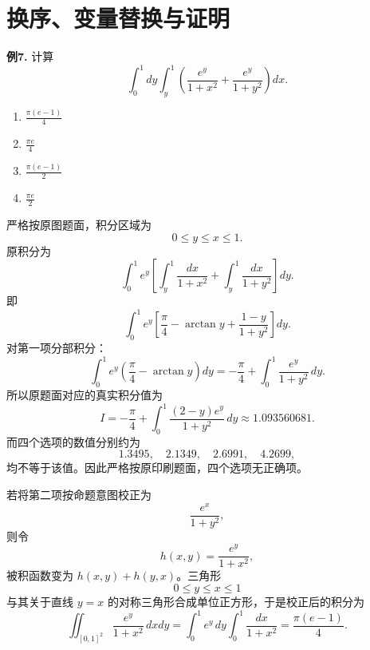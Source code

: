 \section{换序、变量替换与证明}

\begin{problemblock}
\textbf{例7.} 计算
\[
\int_0^1dy\int_y^1
\left(\frac{e^y}{1+x^2}+\frac{e^y}{1+y^2}\right)dx.
\]
\begin{enumerate}[label=\Alph*., leftmargin=2.2em]
\item \(\displaystyle \frac{\pi(e-1)}4\)
\item \(\displaystyle \frac{\pi e}{4}\)
\item \(\displaystyle \frac{\pi(e-1)}2\)
\item \(\displaystyle \frac{\pi e}{2}\)
\end{enumerate}
\end{problemblock}
\begin{solutionblock}
严格按原图题面，积分区域为
\[
0\le y\le x\le1.
\]
原积分为
\[
\int_0^1e^y\left[
\int_y^1\frac{dx}{1+x^2}
+\int_y^1\frac{dx}{1+y^2}
\right]dy.
\]
即
\[
\int_0^1e^y\left[
\frac\pi4-\arctan y+\frac{1-y}{1+y^2}
\right]dy.
\]
对第一项分部积分：
\[
\int_0^1e^y\left(\frac\pi4-\arctan y\right)dy
=-\frac\pi4+\int_0^1\frac{e^y}{1+y^2}\,dy.
\]
所以原题面对应的真实积分值为
\[
I=-\frac\pi4+\int_0^1\frac{(2-y)e^y}{1+y^2}\,dy
\approx1.093560681.
\]
而四个选项的数值分别约为
\[
1.3495,\quad 2.1349,\quad 2.6991,\quad 4.2699,
\]
均不等于该值。因此严格按原印刷题面，四个选项无正确项。

若将第二项按命题意图校正为
\[
\frac{e^x}{1+y^2},
\]
则令
\[
h(x,y)=\frac{e^y}{1+x^2},
\]
被积函数变为 \(h(x,y)+h(y,x)\)。三角形
\[
0\le y\le x\le1
\]
与其关于直线 \(y=x\) 的对称三角形合成单位正方形，于是校正后的积分为
\[
\iint_{[0,1]^2}\frac{e^y}{1+x^2}\,dxdy
=\int_0^1e^y\,dy\int_0^1\frac{dx}{1+x^2}
=\frac{\pi(e-1)}4.
\]
\end{solutionblock}

